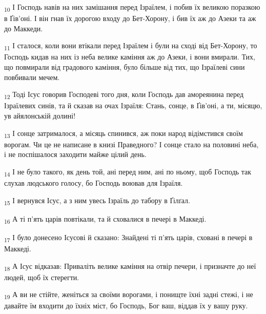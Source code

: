 \begin{tcolorbox}
\textsubscript{10} І Господь навів на них замішання перед Ізраїлем, і побив їх великою поразкою в Ґів'оні. І він гнав їх дорогою входу до Бет-Хорону, і бив їх аж до Азеки та аж до Маккеди.
\end{tcolorbox}
\begin{tcolorbox}
\textsubscript{11} І сталося, коли вони втікали перед Ізраїлем і були на сході від Бет-Хорону, то Господь кидав на них із неба велике каміння аж до Азеки, і вони вмирали. Тих, що повмирали від градового каміння, було більше від тих, що Ізраїлеві сини повбивали мечем.
\end{tcolorbox}
\begin{tcolorbox}
\textsubscript{12} Тоді Ісус говорив Господеві того дня, коли Господь дав амореянина перед Ізраїлевих синів, та й сказав на очах Ізраїля: Стань, сонце, в Ґів'оні, а ти, місяцю, ув айялонській долині!
\end{tcolorbox}
\begin{tcolorbox}
\textsubscript{13} І сонце затрималося, а місяць спинився, аж поки народ відімстився своїм ворогам. Чи це не написане в книзі Праведного? І сонце стало на половині неба, і не поспішалося заходити майже цілий день.
\end{tcolorbox}
\begin{tcolorbox}
\textsubscript{14} І не було такого, як день той, ані перед ним, ані по ньому, щоб Господь так слухав людського голосу, бо Господь воював для Ізраїля.
\end{tcolorbox}
\begin{tcolorbox}
\textsubscript{15} І вернувся Ісус, а з ним увесь Ізраїль до табору в Ґілґал.
\end{tcolorbox}
\begin{tcolorbox}
\textsubscript{16} А ті п'ять царів повтікали, та й сховалися в печері в Маккеді.
\end{tcolorbox}
\begin{tcolorbox}
\textsubscript{17} І було донесено Ісусові й сказано: Знайдені ті п'ять царів, сховані в печері в Маккеді.
\end{tcolorbox}
\begin{tcolorbox}
\textsubscript{18} А Ісус відказав: Приваліть велике каміння на отвір печери, і призначте до неї людей, щоб їх стерегти.
\end{tcolorbox}
\begin{tcolorbox}
\textsubscript{19} А ви не стійте, женіться за своїми ворогами, і понищте їхні задні стежі, і не давайте їм входити до їхніх міст, бо Господь, Бог ваш, віддав їх у вашу руку.
\end{tcolorbox}
